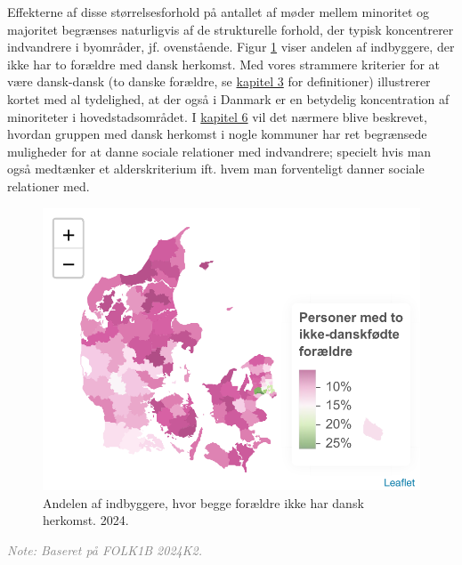 \documentclass[
]{book}
\begin{document}
Effekterne af disse størrelsesforhold på antallet af møder mellem minoritet og majoritet begrænses naturligvis af de strukturelle forhold, der typisk koncentrerer indvandrere i byområder, jf. ovenstående. Figur \ref{fig:fig-1-22} viser andelen af indbyggere, der ikke har to forældre med dansk herkomst. Med vores strammere kriterier for at være dansk-dansk (to danske forældre, se \hyperref[kap3]{kapitel 3} for definitioner) illustrerer kortet med al tydelighed, at der også i Danmark er en betydelig koncentration af minoriteter i hovedstadsområdet. I \hyperref[kap6]{kapitel 6} vil det nærmere blive beskrevet, hvordan gruppen med dansk herkomst i nogle kommuner har ret begrænsede muligheder for at danne sociale relationer med indvandrere; specielt hvis man også medtænker et alderskriterium ift. hvem man forventeligt danner sociale relationer med.

\newpage

\begin{figure}
\includegraphics[width=1\linewidth]{en-befolkning-blander-sig_files/figure-latex/fig-1-22-1} \caption{Andelen af indbyggere, hvor begge forældre ikke har dansk herkomst. 2024.}\label{fig:fig-1-22}
\end{figure}

\begin{footnotesize}\textit{\textcolor{gray}{
Note: Baseret på FOLK1B 2024K2.
}}
\end{footnotesize}
\end{document}
